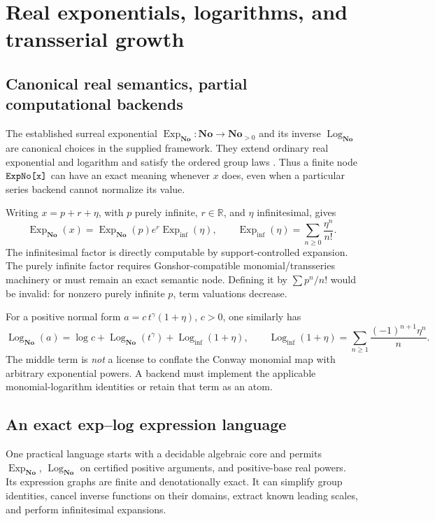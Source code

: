 \documentclass[11pt,letterpaper]{article}
\theoremstyle{definition}
\newcommand{\No}{\mathbf{No}}
\newcommand{\R}{\mathbb R}
\newcommand{\ExpNo}{\operatorname{Exp}_{\No}}
\newcommand{\LogNo}{\operatorname{Log}_{\No}}
\newcommand{\Expi}{\operatorname{Exp}_{\mathrm{inf}}}
\newcommand{\Logi}{\operatorname{Log}_{\mathrm{inf}}}
\newcommand{\code}[1]{\texttt{\detokenize{#1}}}
\numberwithin{equation}{section}
\begin{document}
\section{Real exponentials, logarithms, and transserial growth}\label{sec:exp}
\subsection{Canonical real semantics, partial computational backends}
The established surreal exponential $\ExpNo:\No\to\No_{>0}$ and its inverse $\LogNo$ are canonical choices in the supplied framework. They extend ordinary real exponential and logarithm and satisfy the ordered group laws \cite{Gonshor,vdDE}. Thus a finite node $\code{ExpNo[x]}$ can have an exact meaning whenever $x$ does, even when a particular series backend cannot normalize its value.

Writing $x=p+r+\eta$, with $p$ purely infinite, $r\in\R$, and $\eta$ infinitesimal, gives
\begin{equation}\label{eq:expsplit}
 \ExpNo(x)=\ExpNo(p)e^r\Expi(\eta),\qquad
 \Expi(\eta)=\sum_{n\ge0}\frac{\eta^n}{n!}.
\end{equation}
The infinitesimal factor is directly computable by support-controlled expansion. The purely infinite factor requires Gonshor-compatible monomial/transseries machinery or must remain an exact semantic node. Defining it by $\sum p^n/n!$ would be invalid: for nonzero purely infinite $p$, term valuations decrease.

For a positive normal form $a=c\,t^\gamma(1+\eta)$, $c>0$, one similarly has
\begin{equation}\label{eq:logsplit}
 \LogNo(a)=\log c+\LogNo(t^\gamma)+\Logi(1+\eta),
 \qquad \Logi(1+\eta)=\sum_{n\ge1}\frac{(-1)^{n+1}\eta^n}{n}.
\end{equation}
The middle term is \emph{not} a license to conflate the Conway monomial map with arbitrary exponential powers. A backend must implement the applicable monomial-logarithm identities or retain that term as an atom.

\subsection{An exact exp--log expression language}
One practical language starts with a decidable algebraic core and permits $\ExpNo$, $\LogNo$ on certified positive arguments, and positive-base real powers. Its expression graphs are finite and denotationally exact. It can simplify group identities, cancel inverse functions on their domains, extract known leading scales, and perform infinitesimal expansions.
\end{document}
